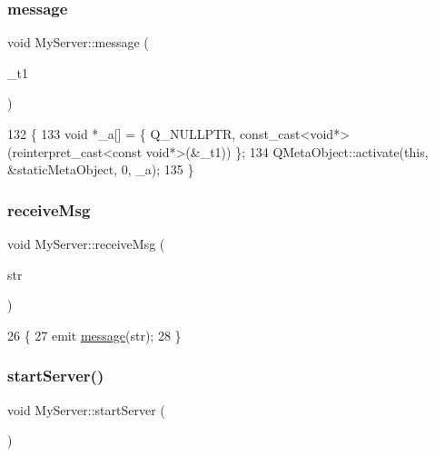 \subsubsection{\texorpdfstring{message}{message}}
{\footnotesize\ttfamily void My\+Server\+::message (\begin{DoxyParamCaption}\item[{Q\+String}]{\+\_\+t1 }\end{DoxyParamCaption})\hspace{0.3cm}{\ttfamily [signal]}}


\begin{DoxyCode}
132 \{
133     \textcolor{keywordtype}{void} *\_a[] = \{ Q\_NULLPTR, \textcolor{keyword}{const\_cast<}\textcolor{keywordtype}{void}*\textcolor{keyword}{>}(\textcolor{keyword}{reinterpret\_cast<}\textcolor{keyword}{const }\textcolor{keywordtype}{void}*\textcolor{keyword}{>}(&\_t1)) \};
134     QMetaObject::activate(\textcolor{keyword}{this}, &staticMetaObject, 0, \_a);
135 \}
\end{DoxyCode}
\mbox{\label{class_my_server_ac795ee6f1607c0fa4e635a0da2bf2164}} 
\subsubsection{\texorpdfstring{receive\+Msg}{receiveMsg}}
{\footnotesize\ttfamily void My\+Server\+::receive\+Msg (\begin{DoxyParamCaption}\item[{Q\+String}]{str }\end{DoxyParamCaption})\hspace{0.3cm}{\ttfamily [slot]}}


\begin{DoxyCode}
26                                     \{
27   emit \mbox{\hyperlink{class_my_server_a2b884bce37840b1b461363a37b463b30}{message}}(str);
28 \}
\end{DoxyCode}
\mbox{\label{class_my_server_a962f0e205a0aaf08b12d50d1315a8c90}} 
\subsubsection{\texorpdfstring{start\+Server()}{startServer()}}
{\footnotesize\ttfamily void My\+Server\+::start\+Server (\begin{DoxyParamCaption}{ }\end{DoxyParamCaption})}



